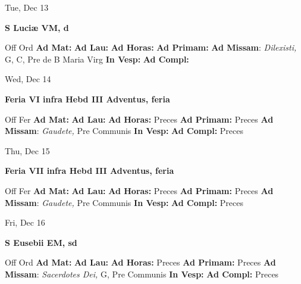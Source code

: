 \documentclass[10pt]{article}
\begin{document}
\begin{minipage}{3.5in}
\vspace{2em}\begin{center}
Tue, Dec 13
\end{center}\textbf{ \large S Luciæ VM, \textnormal{\normalsize d}}
\begin{justify}
Off Ord
\textbf{Ad Mat: }
\textbf{Ad Lau: }
\textbf{Ad Horas: }
\textbf{Ad Primam: }
\textbf{Ad Missam}: \textit{Dilexisti,} G, C, Pre de B Maria Virg
\textbf{In Vesp: }
\textbf{Ad Compl: }\end{justify}
\end{minipage}



\begin{minipage}{3.5in}
\vspace{2em}\begin{center}
Wed, Dec 14
\end{center}\textbf{ \large Feria VI infra Hebd III Adventus, \textnormal{\normalsize feria}}
\begin{justify}
Off Fer
\textbf{Ad Mat: }
\textbf{Ad Lau: }
\textbf{Ad Horas: }Preces
\textbf{Ad Primam: }Preces
\textbf{Ad Missam}: \textit{Gaudete,} Pre Communis
\textbf{In Vesp: }
\textbf{Ad Compl: }Preces\end{justify}
\end{minipage}



\begin{minipage}{3.5in}
\vspace{2em}\begin{center}
Thu, Dec 15
\end{center}\textbf{ \large Feria VII infra Hebd III Adventus, \textnormal{\normalsize feria}}
\begin{justify}
Off Fer
\textbf{Ad Mat: }
\textbf{Ad Lau: }
\textbf{Ad Horas: }Preces
\textbf{Ad Primam: }Preces
\textbf{Ad Missam}: \textit{Gaudete,} Pre Communis
\textbf{In Vesp: }
\textbf{Ad Compl: }Preces\end{justify}
\end{minipage}



\begin{minipage}{3.5in}
\vspace{2em}\begin{center}
Fri, Dec 16
\end{center}\textbf{ \large S Eusebii EM, \textnormal{\normalsize sd}}
\begin{justify}
Off Ord
\textbf{Ad Mat: }
\textbf{Ad Lau: }
\textbf{Ad Horas: }Preces
\textbf{Ad Primam: }Preces
\textbf{Ad Missam}: \textit{Sacerdotes Dei,} G, Pre Communis
\textbf{In Vesp: }
\textbf{Ad Compl: }Preces\end{justify}
\end{minipage}
\end{document}
